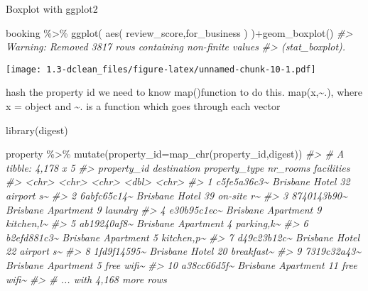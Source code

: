 \documentclass[
]{article}
\newenvironment{Shaded}{\begin{snugshade}}{\end{snugshade}}
\newcommand{\AttributeTok}[1]{\textcolor[rgb]{0.77,0.63,0.00}{#1}}
\newcommand{\CommentTok}[1]{\textcolor[rgb]{0.56,0.35,0.01}{\textit{#1}}}
\newcommand{\FunctionTok}[1]{\textcolor[rgb]{0.00,0.00,0.00}{#1}}
\newcommand{\NormalTok}[1]{#1}
\newcommand{\SpecialCharTok}[1]{\textcolor[rgb]{0.00,0.00,0.00}{#1}}
\begin{document}
Boxplot with ggplot2

\begin{Shaded}
\begin{Highlighting}[]
\NormalTok{booking }\SpecialCharTok{\%\textgreater{}\%} 
  \FunctionTok{ggplot}\NormalTok{(}
    \FunctionTok{aes}\NormalTok{(}
\NormalTok{      review\_score,for\_business}
\NormalTok{    )}
\NormalTok{  )}\SpecialCharTok{+}\FunctionTok{geom\_boxplot}\NormalTok{()}
\CommentTok{\#\textgreater{} Warning: Removed 3817 rows containing non{-}finite values}
\CommentTok{\#\textgreater{} (stat\_boxplot).}
\end{Highlighting}
\end{Shaded}

\texttt{[image: 1.3-dclean\_files/figure-latex/unnamed-chunk-10-1.pdf]}

hash the property id
we need to know map()function to do this. map(x,\textasciitilde.), where x = object and \textasciitilde. is a function which goes through each vector

\begin{Shaded}
\begin{Highlighting}[]
\FunctionTok{library}\NormalTok{(digest)}

\NormalTok{property }\SpecialCharTok{\%\textgreater{}\%} 
  \FunctionTok{mutate}\NormalTok{(}\AttributeTok{property\_id=}\FunctionTok{map\_chr}\NormalTok{(property\_id,digest))}
\CommentTok{\#\textgreater{} \# A tibble: 4,178 x 5}
\CommentTok{\#\textgreater{}    property\_id destination property\_type nr\_rooms facilities}
\CommentTok{\#\textgreater{}    \textless{}chr\textgreater{}       \textless{}chr\textgreater{}       \textless{}chr\textgreater{}            \textless{}dbl\textgreater{} \textless{}chr\textgreater{}     }
\CommentTok{\#\textgreater{}  1 c5fe5a36c3\textasciitilde{} Brisbane    Hotel               32 airport s\textasciitilde{}}
\CommentTok{\#\textgreater{}  2 6abfc65c14\textasciitilde{} Brisbane    Hotel               39 on{-}site r\textasciitilde{}}
\CommentTok{\#\textgreater{}  3 8740143b90\textasciitilde{} Brisbane    Apartment            9 laundry   }
\CommentTok{\#\textgreater{}  4 e30b95c1ec\textasciitilde{} Brisbane    Apartment            9 kitchen,l\textasciitilde{}}
\CommentTok{\#\textgreater{}  5 ab19240af8\textasciitilde{} Brisbane    Apartment            4 parking,k\textasciitilde{}}
\CommentTok{\#\textgreater{}  6 b2efd881c3\textasciitilde{} Brisbane    Apartment            5 kitchen,p\textasciitilde{}}
\CommentTok{\#\textgreater{}  7 d49c23b12c\textasciitilde{} Brisbane    Hotel               22 airport s\textasciitilde{}}
\CommentTok{\#\textgreater{}  8 1fd9f14595\textasciitilde{} Brisbane    Hotel               20 breakfast\textasciitilde{}}
\CommentTok{\#\textgreater{}  9 7319c32a43\textasciitilde{} Brisbane    Apartment            5 free wifi\textasciitilde{}}
\CommentTok{\#\textgreater{} 10 a38cc66d5f\textasciitilde{} Brisbane    Apartment           11 free wifi\textasciitilde{}}
\CommentTok{\#\textgreater{} \# ... with 4,168 more rows}
\end{Highlighting}
\end{Shaded}
\end{document}
